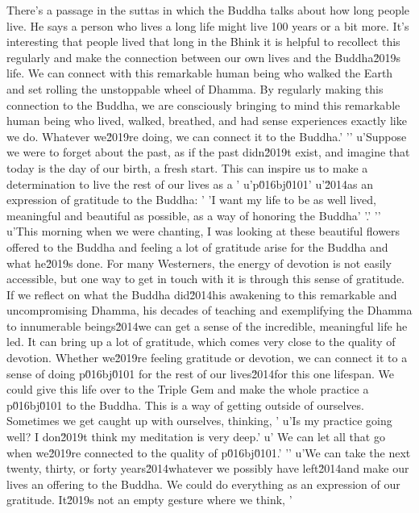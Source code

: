 
There's a passage in the suttas in which the Buddha talks about how 
long people live. He says a person who lives a long life might live 100 
years or a bit more. It's interesting that people lived that long in 
the Bhink it is helpful to recollect this regularly and make the connection between our own lives and the Buddha\u2019s life. We can connect with this remarkable human being who walked the Earth and set rolling the unstoppable wheel of Dhamma. By regularly making this connection to the Buddha, we are consciously bringing to mind this remarkable human being who lived, walked, breathed, and had sense experiences exactly like we do. Whatever we\u2019re doing, we can connect it to the Buddha.'
'\n'
u'Suppose we were to forget about the past, as if the past didn\u2019t exist, and imagine that today is the day of our birth, a fresh start. This can inspire us to make a determination to live the rest of our lives as a '
u'p\u016bj\u0101'
u'\u2014as an expression of gratitude to the Buddha: '
'I want my life to be as well lived, meaningful and beautiful as possible, as a way of honoring the Buddha'
'.'
'\n'
u'This morning when we were chanting, I was looking at these beautiful flowers offered to the Buddha and feeling a lot of gratitude arise for the Buddha and what he\u2019s done. For many Westerners, the energy of devotion is not easily accessible, but one way to get in touch with it is through this sense of gratitude. If we reflect on what the Buddha did\u2014his awakening to this remarkable and uncompromising Dhamma, his decades of teaching and exemplifying the Dhamma to innumerable beings\u2014we can get a sense of the incredible, meaningful life he led. It can bring up a lot of gratitude, which comes very close to the quality of devotion. Whether we\u2019re feeling gratitude or devotion, we can connect it to a sense of doing p\u016bj\u0101 for the rest of our lives\u2014for this one lifespan. We could give this life over to the Triple Gem and make the whole practice a p\u016bj\u0101 to the Buddha. This is a way of getting outside of ourselves. Sometimes we get caught up with ourselves, thinking, '
u'Is my practice going well? I don\u2019t think my meditation is very deep.'
u' We can let all that go when we\u2019re connected to the quality of p\u016bj\u0101.'
'\n'
u'We can take the next twenty, thirty, or forty years\u2014whatever we possibly have left\u2014and make our lives an offering to the Buddha. We could do everything as an expression of our gratitude. It\u2019s not an empty gesture where we think, '
